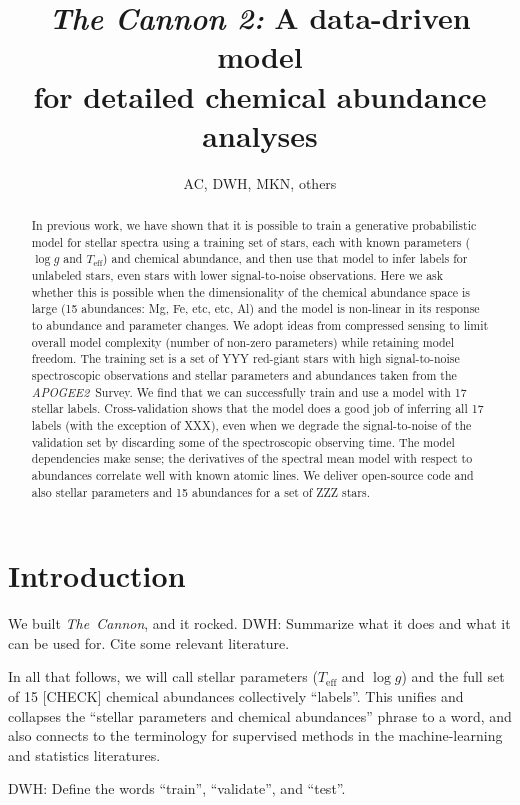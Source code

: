 \documentclass[12pt,preprint]{aastex}
\newcommand{\project}[1]{\textsl{#1}}
\newcommand{\thecannon}{\project{The~Cannon}}
\newcommand{\acronym}[1]{\small{#1}}
\newcommand{\apogee}{\project{\acronym{APOGEE2}}}
\newcommand{\logg}{\log g}
\newcommand{\Teff}{T_{\mathrm{eff}}}
\begin{document}
\title{\textsl{The Cannon 2:} A data-driven model \\ for detailed chemical abundance analyses}
\author{AC, DWH, MKN, others}

\begin{abstract}
In previous work, we have shown that it is possible to train a generative
probabilistic model for stellar spectra using a training set of stars, each with known
parameters ($\logg$ and $\Teff$) and chemical abundance, and then use that model to infer labels for
unlabeled stars, even stars with lower signal-to-noise observations.
Here we ask whether this is possible when the dimensionality of the chemical
abundance space is large (15 abundances: Mg, Fe, etc, etc, Al)
and the model is non-linear in its response to abundance and parameter changes.
We adopt ideas from compressed sensing to limit overall model complexity (number
of non-zero parameters) while retaining model freedom.
The training set is a set of YYY red-giant stars with high signal-to-noise
spectroscopic observations and stellar parameters and abundances taken from the
\apogee\ Survey.
We find that we can successfully train and use a model with 17 stellar labels.
Cross-validation shows that the model does a good job of inferring all 17 labels
(with the exception of XXX), even when we degrade the signal-to-noise of the
validation set by discarding some of the spectroscopic observing time.
The model dependencies make sense; the derivatives of the spectral mean model
with respect to abundances correlate well with known atomic lines.
We deliver open-source code and also stellar parameters and 15 abundances for a
set of ZZZ stars.
\end{abstract}

\section{Introduction}

We built \thecannon, and it rocked.
DWH: Summarize what it does and what it can be used for.
Cite some relevant literature.

In all that follows, we will call stellar parameters ($\Teff$ and
$\logg$) and the full set of 15 [CHECK] chemical abundances
collectively ``labels''.
This unifies and collapses the ``stellar parameters and chemical
abundances'' phrase to a word, and also connects to the terminology
for supervised methods in the machine-learning and statistics
literatures.

DWH: Define the words ``train'', ``validate'', and ``test''.
\end{document}
